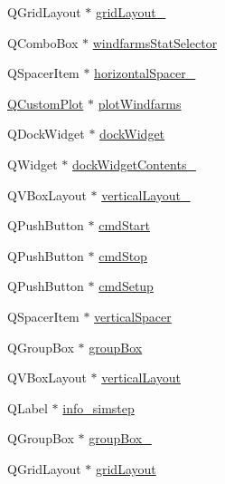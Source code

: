 \begin{DoxyCompactItemize}
Q\+Grid\+Layout $\ast$ \mbox{\hyperlink{class_ui___main_window_a8731b71c513ff94baf59614807823c5d}{grid\+Layout\+\_}}
\item 
Q\+Combo\+Box $\ast$ \mbox{\hyperlink{class_ui___main_window_a81b58ec0d789b96ee13cfcbd396edaef}{windfarms\+Stat\+Selector}}
\item 
Q\+Spacer\+Item $\ast$ \mbox{\hyperlink{class_ui___main_window_abbed496dbaf0c1a9e78d2a954cd2da88}{horizontal\+Spacer\+\_}}
\item 
\mbox{\hyperlink{class_q_custom_plot}{Q\+Custom\+Plot}} $\ast$ \mbox{\hyperlink{class_ui___main_window_a72f2c99d11441187a08934277619673a}{plot\+Windfarms}}
\item 
Q\+Dock\+Widget $\ast$ \mbox{\hyperlink{class_ui___main_window_ac8a083c4b66fb317a9b538409ce412e2}{dock\+Widget}}
\item 
Q\+Widget $\ast$ \mbox{\hyperlink{class_ui___main_window_a9a843dd5296065a2d320fa8f083e4b59}{dock\+Widget\+Contents\+\_}}
\item 
Q\+V\+Box\+Layout $\ast$ \mbox{\hyperlink{class_ui___main_window_afcc20a3d5058037a00cdc6122f231848}{vertical\+Layout\+\_}}
\item 
Q\+Push\+Button $\ast$ \mbox{\hyperlink{class_ui___main_window_a3bbe311d9ba6eb92f102045b5fed9233}{cmd\+Start}}
\item 
Q\+Push\+Button $\ast$ \mbox{\hyperlink{class_ui___main_window_a848b9ed7b246f64d68a311bd0f9f6f8f}{cmd\+Stop}}
\item 
Q\+Push\+Button $\ast$ \mbox{\hyperlink{class_ui___main_window_ab7b293197ad11590fd40991b1048e08f}{cmd\+Setup}}
\item 
Q\+Spacer\+Item $\ast$ \mbox{\hyperlink{class_ui___main_window_a8384329c3663ff274e926a12024aab52}{vertical\+Spacer}}
\item 
Q\+Group\+Box $\ast$ \mbox{\hyperlink{class_ui___main_window_aef7cb3be8cecfc9aaf98f036a98781ce}{group\+Box}}
\item 
Q\+V\+Box\+Layout $\ast$ \mbox{\hyperlink{class_ui___main_window_a649287f742c9a33b8444116dccb1b72b}{vertical\+Layout}}
\item 
Q\+Label $\ast$ \mbox{\hyperlink{class_ui___main_window_aa7c0eb79ea1c625fbba621e35a5a3f2c}{info\+\_\+simstep}}
\item 
Q\+Group\+Box $\ast$ \mbox{\hyperlink{class_ui___main_window_abb28acde35ffce4d0e6152579df2cbc3}{group\+Box\+\_}}
\item 
Q\+Grid\+Layout $\ast$ \mbox{\hyperlink{class_ui___main_window_a525ed3c5fe0784ac502ee222fba4e205}{grid\+Layout}}

\end{DoxyCompactItemize}
